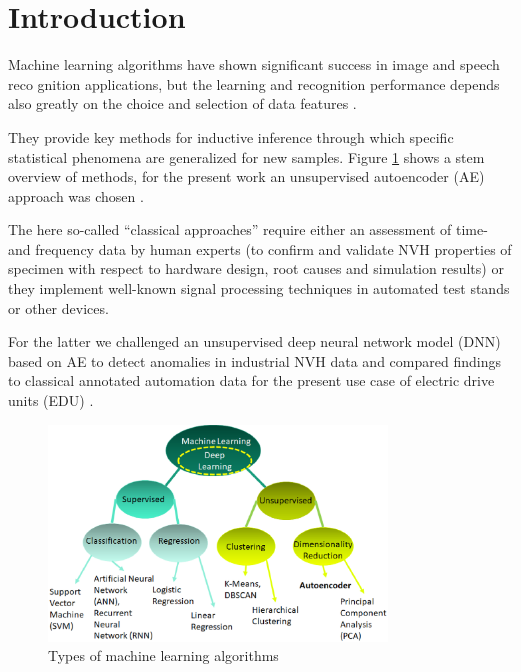 \documentclass[a4paper, 10pt, twocolumn]{article}
\begin{document}
\section*{Introduction}
\label{sec:Introduction}
Machine learning algorithms have shown signiﬁcant success in image and speech reco gnition applications, but the learning and recognition performance depends also greatly on the choice and selection of data features \cite{b1}.
\par
They provide key methods for inductive inference through which speciﬁc statistical phenomena are generalized for new samples. Figure \ref{fig:types_of_ml} shows a stem overview of methods, for the present work an unsupervised autoencoder (AE) approach was chosen \cite{b2}.
\par
The here so-called \enquote{classical approaches} require either an assessment of time- and frequency data by human experts (to conﬁrm and validate NVH properties of specimen with respect to hardware design, root causes and simulation results) or they implement well-known signal processing techniques in automated test stands or other devices. 
\par
For the latter we challenged an unsupervised deep neural network model (DNN) based on AE to detect anomalies in industrial NVH data and compared ﬁndings to classical annotated automation data for the present use case of electric drive units (EDU) \cite{b3}.

  

\begin{figure}[hbt]
    \begin{center}
        \includegraphics[width=9cm]{ml_types.eps}
    \end{center}
    \caption{Types of machine learning algorithms}
    \label{fig:types_of_ml}
\end{figure}
\end{document}
